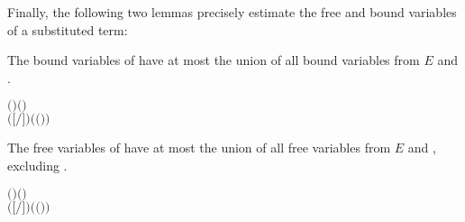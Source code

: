 Finally, the following two lemmas precisely estimate the free and
bound variables of a substituted term:
\begin{lemma}
The bound variables of  have
at most the union of all bound variables from $E$ and .
\begin{alltt}
\HOLTokenTurnstile{}   \HOLSymConst{\HOLTokenConj{}}   \HOLSymConst{\ensuremath{=}}   \HOLSymConst{\HOLTokenConj{}}  \ensuremath{(} \ensuremath{)} \ensuremath{(} \ensuremath{)} \HOLSymConst{\HOLTokenImp{}}
    \ensuremath{(}\ensuremath{[}\ensuremath{/}\ensuremath{]} \ensuremath{)} \HOLSymConst{\HOLTokenSubset{}}   \HOLSymConst{\HOLTokenUnion{}}  \ensuremath{(}  \ensuremath{(} \ensuremath{)}\ensuremath{)}
\end{alltt}
\end{lemma}

\begin{lemma}
The free variables of  have
at most the union of all free variables from $E$ and ,
excluding .
\begin{alltt}
\HOLTokenTurnstile{}   \HOLSymConst{\HOLTokenConj{}}   \HOLSymConst{\ensuremath{=}}   \HOLSymConst{\HOLTokenConj{}}  \ensuremath{(} \ensuremath{)} \ensuremath{(} \ensuremath{)} \HOLSymConst{\HOLTokenImp{}}
    \ensuremath{(}\ensuremath{[}\ensuremath{/}\ensuremath{]} \ensuremath{)} \HOLSymConst{\HOLTokenSubset{}}      \HOLSymConst{\HOLTokenUnion{}}  \ensuremath{(}  \ensuremath{(} \ensuremath{)}\ensuremath{)}
\end{alltt}
\end{lemma}


